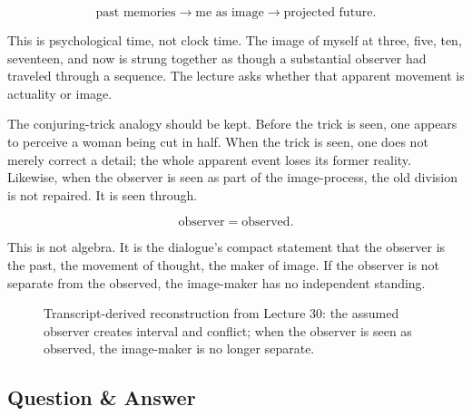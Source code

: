 \documentclass[11pt,oneside]{book}
\begin{document}
\begin{equation}
\text{past memories}
\longrightarrow
\text{me as image}
\longrightarrow
\text{projected future}.
\end{equation}

This is psychological time, not clock time. The image of myself at three, five, ten, seventeen, and now is strung together as though a substantial observer had traveled through a sequence. The lecture asks whether that apparent movement is actuality or image.

The conjuring-trick analogy should be kept. Before the trick is seen, one appears to perceive a woman being cut in half. When the trick is seen, one does not merely correct a detail; the whole apparent event loses its former reality. Likewise, when the observer is seen as part of the image-process, the old division is not repaired. It is seen through.

\begin{equation}
\text{observer} = \text{observed}.
\end{equation}

This is not algebra. It is the dialogue's compact statement that the observer is the past, the movement of thought, the maker of image. If the observer is not separate from the observed, the image-maker has no independent standing.

\begin{figure}
\centering
{}
\caption{Transcript-derived reconstruction from Lecture 30: the assumed observer creates interval and conflict; when the observer is seen as observed, the image-maker is no longer separate.}
\end{figure}

\subsection{Question \& Answer}
\end{document}
